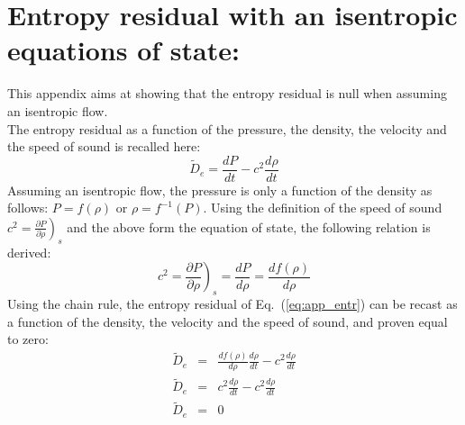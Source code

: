 \documentclass[preprint,10pt]{elsarticle}
\newcommand{\eqt}[1]{Eq.~(\ref{#1})}                     %
\begin{document}
\section{Entropy residual with an isentropic equations of state:} \label{app:ise_equ}
This appendix aims at showing that the entropy residual is null when assuming an isentropic flow. \\
The entropy residual as a function of the pressure, the density, the velocity and the speed of sound is recalled here:
\begin{equation}\label{eq:app_entr}
\tilde{D}_e = \frac{dP}{dt} - c^2 \frac{d \rho}{dt}
\end{equation}
Assuming an isentropic flow, the pressure is only a function of the density as follows: $P = f( \rho )$ or $\rho = f^{-1}( P )$. Using the definition of the speed of sound $c^2 = \left. \frac{\partial P}{\partial \rho} \right)_s$ and the above form the equation of state, the following relation is derived:
\begin{equation}\label{eq:app_sp}
c^2 = \left. \frac{\partial P}{\partial \rho} \right)_s = \frac{d P}{d \rho} = \frac{d f(\rho)}{d \rho}
\end{equation}
Using the chain rule, the entropy residual of \eqt{eq:app_entr} can be recast as a function of the density, the velocity and the speed of sound, and proven equal to zero:
\begin{eqnarray}
\tilde{D}_e &=& \frac{d f(\rho)}{d \rho} \frac{d\rho}{dt} - c^2 \frac{d \rho}{dt} \nonumber\\
\tilde{D}_e &=& c^2 \frac{d\rho}{dt} - c^2 \frac{d \rho}{dt} \nonumber\\
\tilde{D}_e &=&  0 \nonumber
\end{eqnarray}
\end{document}
